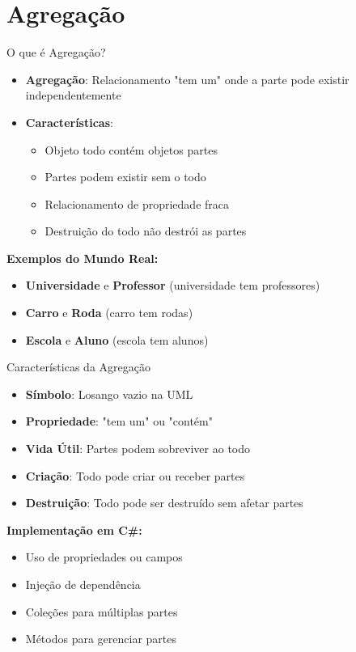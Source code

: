 \documentclass[aspectratio=169]{beamer}
\begin{document}
\section{Agregação}

\begin{frame}{O que é Agregação?}
\begin{itemize}
\item \textbf{Agregação}: Relacionamento "tem um" onde a parte pode existir independentemente
\item \textbf{Características}:
\begin{itemize}
\item Objeto todo contém objetos partes
\item Partes podem existir sem o todo
\item Relacionamento de propriedade fraca
\item Destruição do todo não destrói as partes
\end{itemize}
\end{itemize}

\vspace{0.3cm}
\textbf{Exemplos do Mundo Real:}
\begin{itemize}
\item \textbf{Universidade} e \textbf{Professor} (universidade tem professores)
\item \textbf{Carro} e \textbf{Roda} (carro tem rodas)
\item \textbf{Escola} e \textbf{Aluno} (escola tem alunos)
\end{itemize}
\end{frame}

\begin{frame}{Características da Agregação}
\begin{itemize}
\item \textbf{Símbolo}: Losango vazio na UML
\item \textbf{Propriedade}: "tem um" ou "contém"
\item \textbf{Vida Útil}: Partes podem sobreviver ao todo
\item \textbf{Criação}: Todo pode criar ou receber partes
\item \textbf{Destruição}: Todo pode ser destruído sem afetar partes
\end{itemize}

\vspace{0.5cm}
\textbf{Implementação em C\#:}
\begin{itemize}
\item Uso de propriedades ou campos
\item Injeção de dependência
\item Coleções para múltiplas partes
\item Métodos para gerenciar partes
\end{itemize}
\end{frame}
\end{document}
